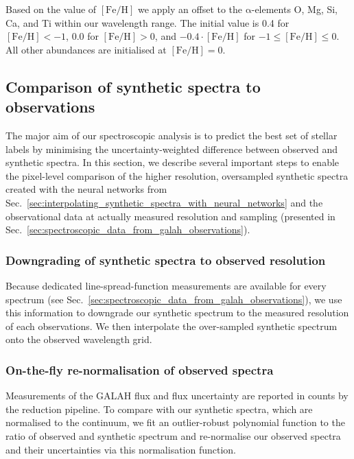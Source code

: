 \documentclass[
  journal=pasa,
  manuscript=research-paper, %
  year=2023,
  volume=37
]{cup-journal}
\newcommand{\feh}{$\mathrm{[Fe/H]}$\xspace}
\begin{document}
Based on the value of \feh we apply an offset to the $\mathrm{\alpha}$-elements O, Mg, Si, Ca, and Ti within our wavelength range. The initial value is 0.4 for $\mathrm{[Fe/H]} < -1$, 0.0 for $\mathrm{[Fe/H]} > 0$, and $-0.4\cdot \mathrm{[Fe/H]}$ for $-1 \leq \mathrm{[Fe/H]} \leq 0$. All other abundances are initialised at $\mathrm{[Fe/H]} = 0$.

\subsection{Comparison of synthetic spectra to observations}
\label{sec:comparison_synthetic_spectra_to_observations}

The major aim of our spectroscopic analysis is to predict the best set of stellar labels by minimising the uncertainty-weighted difference between observed and synthetic spectra. In this section, we describe several important steps to enable the pixel-level comparison of the higher resolution, oversampled synthetic spectra created with the neural networks from Sec.~\ref{sec:interpolating_synthetic_spectra_with_neural_networks} and the observational data at actually measured resolution and sampling (presented in Sec.~\ref{sec:spectroscopic_data_from_galah_observations}).

\subsubsection{Downgrading of synthetic spectra to observed resolution}

Because dedicated line-spread-function measurements are available for every spectrum (see Sec.~\ref{sec:spectroscopic_data_from_galah_observations}), we use this information to downgrade our synthetic spectrum to the measured resolution of each observations. We then interpolate the over-sampled synthetic spectrum onto the observed wavelength grid.

\subsubsection{On-the-fly re-normalisation of observed spectra}

Measurements of the GALAH flux and flux uncertainty are reported in counts by the reduction pipeline. To compare with our synthetic spectra, which are normalised to the continuum, we fit an outlier-robust polynomial function to the ratio of observed and synthetic spectrum and re-normalise our observed spectra and their uncertainties via this normalisation function.
\end{document}

